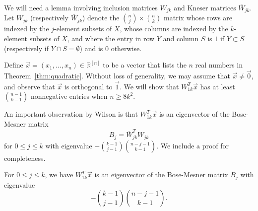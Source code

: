 \documentclass[12pt]{article}
\theoremstyle{plain}
{\theorembodyfont{\slshape}
\newtheorem{theorem}{Theorem}[section]
\newtheorem{lemma}[theorem]{Lemma}
\newtheorem{corollary}[theorem]{Corollary}}
\newcommand\tref[1]{Theorem~\ref{thm:#1}}
\begin{document}
We will need a lemma involving inclusion matrices $W_{jk}$ and Kneser matrices $\overline{W}_{jk}$. Let $W_{jk}$ (respectively $\overline{W}_{jk}$) denote the $\binom{n}{j} \times \binom{n}{k}$ matrix whose rows are indexed by the $j$-element subsets of $X$, whose columns are indexed by the $k$-element subsets of $X$, and where the entry in row $Y$ and column $S$ is $1$ if $Y \subset S$ (respectively if $Y \cap S = \emptyset$) and is 0 otherwise.

Define $\vec{x} = (x_{1}, \ldots, x_{n}) \in \mathbb{R}^{[n]}$ to be a vector that lists the $n$ real numbers in \tref{quadratic}. Without loss of generality, we may assume that $\vec{x} \neq \vec{0}$, and observe that $\vec{x}$ is orthogonal to $\vec{1}$. We will show that $W_{1k}^{T} \vec{x}$ has at least $\binom{n-1}{k-1}$ nonnegative entries when $n \geq 8k^{2}$.

An important observation by Wilson \cite{WilsonExact} is that $W_{1k}^{T} \vec{x}$ is an eigenvector of the Bose-Mesner matrix
\begin{equation}
\label{bosemesner}
B_{j} = \overline{W}_{jk}^{T}W_{jk}
\end{equation}
for $0 \leq j \leq k$ with eigenvalue $- \binom{k-1}{j-1} \binom{n-j-1}{k-1}$. We include a proof for completeness.

\begin{lemma}
\label{lem:eigenvecset}
For $0 \leq j \leq k$, we have $W_{1k}^{T} \vec{x}$ is an eigenvector of the Bose-Mesner matrix $B_{j}$ with eigenvalue
\begin{equation}
\label{seteigenval}
-\binom{k-1}{j-1} \binom{n-j-1}{k-1}.
\end{equation}
\end{lemma}
\end{document}
